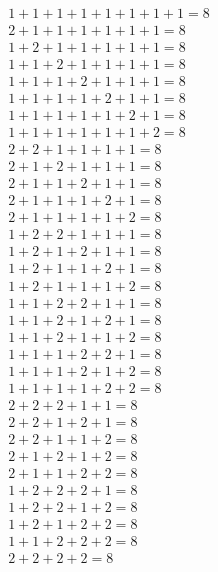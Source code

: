 \documentclass[12pt]{article}
\begin{document}
    \begin{equation}
        \begin{split}
            1+1+1+1+1+1+1+1=8\\
            2+1+1+1+1+1+1=8\\
            1+2+1+1+1+1+1=8\\
            1+1+2+1+1+1+1=8\\
            1+1+1+2+1+1+1=8\\
            1+1+1+1+2+1+1=8\\
            1+1+1+1+1+2+1=8\\
            1+1+1+1+1+1+2=8\\
            2+2+1+1+1+1=8\\
            2+1+2+1+1+1=8\\
            2+1+1+2+1+1=8\\
            2+1+1+1+2+1=8\\
            2+1+1+1+1+2=8\\
            1+2+2+1+1+1=8\\
            1+2+1+2+1+1=8\\
            1+2+1+1+2+1=8\\
            1+2+1+1+1+2=8\\
            1+1+2+2+1+1=8\\
            1+1+2+1+2+1=8\\
            1+1+2+1+1+2=8\\
            1+1+1+2+2+1=8\\
            1+1+1+2+1+2=8\\
            1+1+1+1+2+2=8\\
            2+2+2+1+1=8\\
            2+2+1+2+1=8\\
            2+2+1+1+2=8\\
            2+1+2+1+2=8\\
            2+1+1+2+2=8\\
            1+2+2+2+1=8\\
            1+2+2+1+2=8\\
            1+2+1+2+2=8\\
            1+1+2+2+2=8\\
            2+2+2+2=8\\
        \end{split}
    \end{equation}
\end{document}
